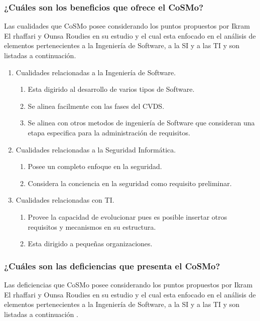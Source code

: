 \documentclass[runningheads,a4paper]{llncs}
\begin{document}
\subsubsection{¿Cuáles son los beneficios que ofrece el \gls{CoSMo}?}
Las cualidades que \gls{CoSMo} posee considerando los puntos propuestos por Ikram El rhaffari y Ounsa Roudies en su estudio y el cual esta enfocado en el análisis de elementos pertenecientes a la Ingeniería de \gls{Software}, a la \gls{SI} y a las \gls{TI} y son listadas a continuación.  

\begin{enumerate}
	\item Cualidades relacionadas a la Ingeniería de \gls{Software}.
		\begin{enumerate}
			\item Esta digirido al desarrollo de varios tipos de \gls{Software}.
			\item Se alinea facilmente con las fases del \gls{CVDS}.
			\item Se alinea con otros metodos de ingeniería de \gls{Software} que consideran una etapa especifica para la administración de requisitos.\\
			
		\end{enumerate}
	\item Cualidades relacionadas a la Seguridad Informática.
		\begin{enumerate}
			\item Posee un completo enfoque en la seguridad.
			\item Considera la conciencia en la seguridad como requisito preliminar.\\

		\end{enumerate}
	\item Cualidades relacionadas con \gls{TI}.
		\begin{enumerate} 
			\item Provee la capacidad de evolucionar pues es posible insertar otros requisitos y mecanismos en su estructura.
			\item Esta dirigido a pequeñas organizaciones.\\
		\end{enumerate}
\end{enumerate}

\subsubsection{¿Cuáles son las deficiencias que presenta el \gls{CoSMo}?}
Las deficiencias que \gls{CoSMo} posee considerando los puntos propuestos por Ikram El rhaffari y Ounsa Roudies en su estudio y el cual esta enfocado en el análisis de elementos pertenecientes a la Ingeniería de \gls{Software}, a la \gls{SI} y a las \gls{TI} y son listadas a continuación \cite{BenchmarkingSDLCLAPS}.
\end{document}
